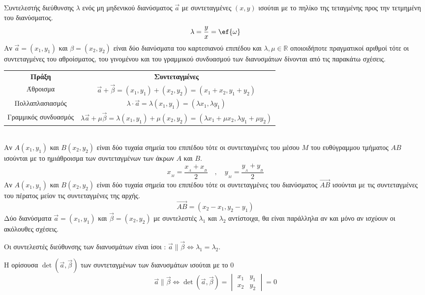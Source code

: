 \documentclass[twoside,nofonts,internet,shmeiwseis]{thewria}
\begin{document}
Συντελεστής διεύθυνσης $ \lambda $ ενός μη μηδενικού διανύσματος $ \vec{a} $ με συντεταγμένες $ (x,y) $ ισούται με το πηλίκο της τεταγμένης προς την τετμημένη του διανύσματος.
\[ \lambda=\frac{y}{x}=\ef{\omega} \]
\thewrhmata
{}
Αν $ \vec{a}=(x_1,y_1) $ και $ \beta=(x_2,y_2) $ είναι δύο διανύσματα του καρτεσιανού επιπέδου και $ \lambda,\mu\in\mathbb{R} $ οποιοιδήποτε πραγματικοί αριθμοί τότε οι συντεταγμένες του αθροίσματος, του γινομένου και του γραμμικού συνδυασμού των διανυσμάτων δίνονται από τις παρακάτω σχέσεις.
\begin{center}
\begin{tabular}{cc}
\hline \rule[-2ex]{0pt}{5.5ex} \textbf{Πράξη} & \textbf{Συντεταγμένες} \\ 
\hhline{==} \rule[-2ex]{0pt}{5.5ex} Άθροισμα & $ \vec{a}+\vec{\beta}=(x_1,y_1)+(x_2,y_2)=(x_1+x_2,y_1+y_2) $ \\ 
 \rule[-2ex]{0pt}{5.5ex} Πολλαπλασιασμός & $ \lambda\cdot\vec{a}=\lambda(x_1,y_1)=(\lambda x_1,\lambda y_1) $ \\ 
 \rule[-2ex]{0pt}{5.5ex} Γραμμικός συνδυασμός & $ \lambda\vec{a}+\mu\vec{\beta}=\lambda(x_1,y_1)+\mu(x_2,y_2)=(\lambda x_1+\mu x_2,\lambda y_1+\mu y_2) $ \\ 
\hline 
\end{tabular}
\end{center}\mbox{}\\
Αν $ A(x_1,y_1) $ και $ B(x_2,y_2) $ είναι δύο τυχαία σημεία του επιπέδου τότε οι συντεταγμένες του μέσου $ M $ του ευθύγραμμου τμήματος $ AB $ ισούνται με το ημιάθροισμα των συντεταγμένων των άκρων $ A $ και $ B $.
\[ x_{_M}=\frac{x_{_A}+x_{_B}}{2}\quad,\quad y_{_M}=\frac{y_{_A}+y_{_B}}{2} \]
Αν $ A(x_1,y_1) $ και $ B(x_2,y_2) $ είναι δύο τυχαία σημεία του επιπέδου τότε οι συντεταγμένες του διανύσματος $ \overrightarrow{AB} $ ισούνται με τις συντεταγμένες του πέρατος μείον τις συντεταγμένες της αρχής.
\[ \overrightarrow{AB}=\left(x_2-x_1,y_2-y_1 \right)  \]
Δύο διανύσματα $ \vec{a}=(x_1,y_1) $ και $ \vec{\beta}=(x_2,y_2) $ με συντελεστές $ \lambda_1 $ και $ \lambda_2 $ αντίστοιχα, θα είναι παράλληλα αν και μόνο αν ισχύουν οι ακόλουθες σχέσεις.
\begin{rlist}
\item Οι συντελεστές διεύθυνσης των διανυσμάτων είναι ίσοι : $ \vec{a}\parallel\vec{\beta}\Leftrightarrow \lambda_1=\lambda_2 $.
\item Η ορίσουσα $ \det{(\vec{a},\vec{\beta})} $ των συντεταγμένων των διανυσμάτων ισούται με το $ 0 $
\[  \vec{a}\parallel\vec{\beta}\Leftrightarrow \det{(\vec{a},\vec{\beta})}=\begin{vmatrix}
x_1 & y_1\\x_2 & y_2
\end{vmatrix}=0 \]
\end{rlist}
\end{document}
